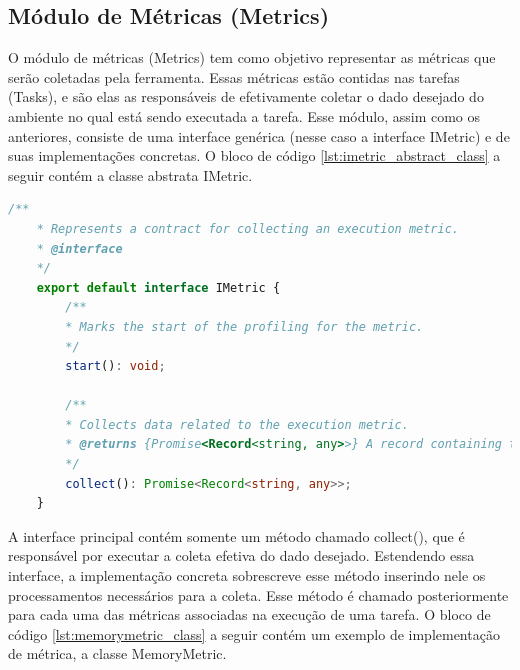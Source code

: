 \documentclass[12pt]{tcc}
\begin{document}
	\subsection{Módulo de Métricas (Metrics)}
	\label{subsection:modulo-metrics}

	O módulo de métricas (Metrics) tem como objetivo representar as métricas que serão coletadas pela ferramenta. Essas métricas estão contidas nas tarefas (Tasks), e são elas as responsáveis de efetivamente coletar o dado desejado do ambiente no qual está sendo executada a tarefa. Esse módulo, assim como os anteriores, consiste de uma interface genérica (nesse caso a interface IMetric) e de suas implementações concretas. O bloco de código \ref{lst:imetric_abstract_class} a seguir contém a classe abstrata IMetric.

	\begin{lstlisting}[label={lst:imetric_abstract_class}, caption={Implementação da classe responsável por representar uma métrica.}, language=TypeScript, breaklines=true]
	/**
	* Represents a contract for collecting an execution metric.
	* @interface
	*/
	export default interface IMetric {
		/**
		* Marks the start of the profiling for the metric.
		*/
		start(): void;

		/**
		* Collects data related to the execution metric.
		* @returns {Promise<Record<string, any>>} A record containing the collected metric data.
		*/
		collect(): Promise<Record<string, any>>;
	}
	\end{lstlisting}

	A interface principal contém somente um método chamado collect(), que é responsável por executar a coleta efetiva do dado desejado. Estendendo essa interface, a implementação concreta sobrescreve esse método inserindo nele os processamentos necessários para a coleta. Esse método é chamado posteriormente para cada uma das métricas associadas na execução de uma tarefa. O bloco de código \ref{lst:memorymetric_class} a seguir contém um exemplo de implementação de métrica, a classe MemoryMetric.
\end{document}

